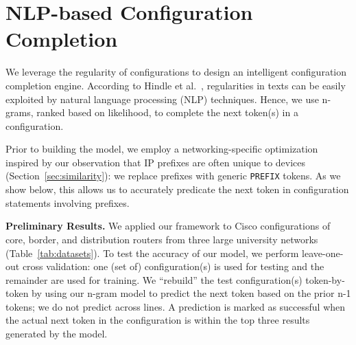 \section{NLP-based Configuration Completion}

We leverage the regularity of configurations to design an intelligent
configuration completion engine.
According to Hindle et al.~\cite{naturalness}, regularities in texts
can be easily exploited by natural language processing (NLP) techniques.
Hence, we use n-grams, ranked based on likelihood, to complete
the next token(s) in a configuration.

Prior to building the model, we employ a networking-specific optimization
inspired by our observation that IP prefixes are often unique to devices
(Section~\ref{sec:similarity}): we replace prefixes with generic {\tt PREFIX}
tokens. As we show below, this allows us to accurately
predicate the next token in configuration statements involving prefixes.



{\bf Preliminary Results.} We applied our framework to Cisco configurations of
core, border, and distribution routers from three large university networks
(Table~\ref{tab:datasets}). To test the accuracy of our model, we perform
leave-one-out cross validation: one (set of) configuration(s) is used for
testing and the remainder are used for training. We ``rebuild'' the test
configuration(s) token-by-token by using our n-gram model to predict the next
token based on the  prior n-1 tokens; we do not predict across lines. A
prediction is marked as successful when the actual next token in the
configuration is within the top three results generated by the model. 

